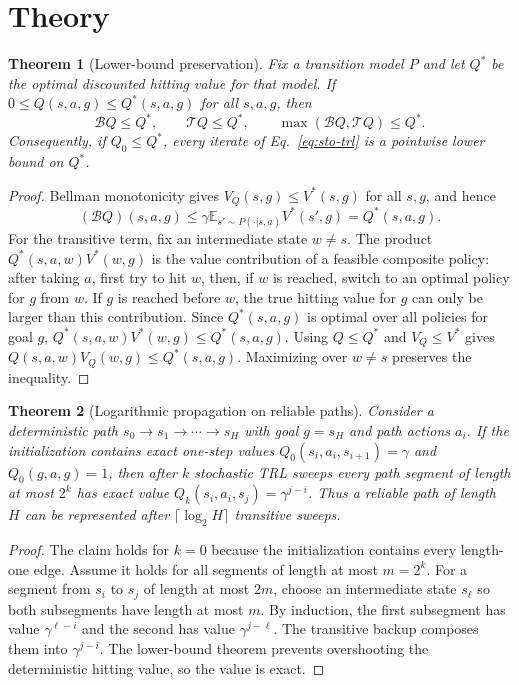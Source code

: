 \documentclass[10pt]{article}
\newtheorem{theorem}{Theorem}
\newcommand{\E}{\mathbb{E}}
\begin{document}
\section{Theory}

\begin{theorem}[Lower-bound preservation]
Fix a transition model $P$ and let $Q^*$ be the optimal discounted hitting
value for that model. If $0\leq Q(s,a,g)\leq Q^*(s,a,g)$ for all $s,a,g$, then
\[
\mathcal{B}Q\leq Q^*,\qquad \mathcal{T}Q\leq Q^*,\qquad
\max(\mathcal{B}Q,\mathcal{T}Q)\leq Q^*.
\]
Consequently, if $Q_0\leq Q^*$, every iterate of Eq.~\eqref{eq:sto-trl} is a
pointwise lower bound on $Q^*$.
\end{theorem}

\begin{proof}
Bellman monotonicity gives $V_Q(s,g)\leq V^*(s,g)$ for all $s,g$, and hence
\[
(\mathcal{B}Q)(s,a,g)
\leq \gamma \E_{s'\sim P(\cdot|s,a)} V^*(s',g)
= Q^*(s,a,g).
\]
For the transitive term, fix an intermediate state $w\neq s$. The product
$Q^*(s,a,w)V^*(w,g)$ is the value contribution of a feasible composite policy:
after taking $a$, first try to hit $w$, then, if $w$ is reached, switch to an
optimal policy for $g$ from $w$. If $g$ is reached before $w$, the true hitting
value for $g$ can only be larger than this contribution. Since $Q^*(s,a,g)$ is
optimal over all policies for goal $g$,
$Q^*(s,a,w)V^*(w,g)\leq Q^*(s,a,g)$. Using $Q\leq Q^*$ and
$V_Q\leq V^*$ gives $Q(s,a,w)V_Q(w,g)\leq Q^*(s,a,g)$. Maximizing over
$w\neq s$ preserves the inequality.
\end{proof}

\begin{theorem}[Logarithmic propagation on reliable paths]
Consider a deterministic path $s_0\to s_1\to\cdots\to s_H$ with goal $g=s_H$
and path actions $a_i$. If the initialization contains exact one-step values
$Q_0(s_i,a_i,s_{i+1})=\gamma$ and $Q_0(g,a,g)=1$, then after $k$ stochastic
TRL sweeps every path segment of length at most $2^k$ has exact value
$Q_k(s_i,a_i,s_j)=\gamma^{j-i}$. Thus a reliable path of length $H$ can be
represented after $\lceil\log_2 H\rceil$ transitive sweeps.
\end{theorem}

\begin{proof}
The claim holds for $k=0$ because the initialization contains every
length-one edge. Assume it holds for all segments of length at most $m=2^k$.
For a segment from $s_i$ to $s_j$ of length at most $2m$, choose an
intermediate state $s_\ell$ so both subsegments have length at most $m$. By
induction, the first subsegment has value $\gamma^{\ell-i}$ and the second has
value $\gamma^{j-\ell}$. The transitive backup composes them into
$\gamma^{j-i}$. The lower-bound theorem prevents overshooting the deterministic
hitting value, so the value is exact.
\end{proof}
\end{document}
